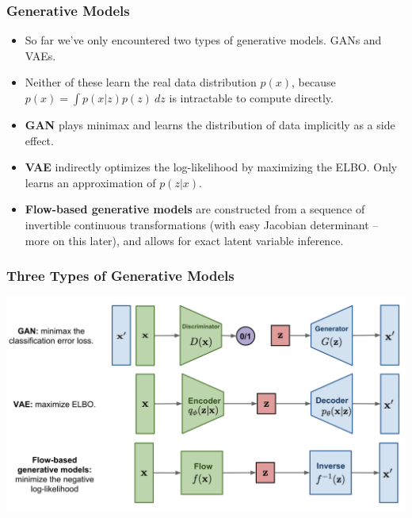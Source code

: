 \documentclass{beamer}
\begin{document}
\begin{frame}
  \frametitle{Generative Models}

  \begin{itemize}
    \item So far we've only encountered two types of generative models.
      GANs and VAEs.

    \item Neither of these learn the real data distribution $p(x)$,
      because $p(x) = \int p(x | z) p(z)\ dz$ is intractable to compute
      directly.

    \item \textbf{GAN} plays minimax and learns the distribution of data implicitly as a
      side effect.

    \item \textbf{VAE} indirectly optimizes the log-likelihood by maximizing the
      ELBO. Only learns an approximation of $p(z | x)$.

    \item \textbf{Flow-based generative models} are constructed from a sequence
      of invertible continuous transformations (with easy Jacobian determinant
      -- more on this later), and allows for exact latent variable inference.
  \end{itemize}

\end{frame}


\begin{frame}
  \frametitle{Three Types of Generative Models}

  \includegraphics[width=1.0\textwidth]{three-generative-models.png}
\end{frame}
\end{document}
